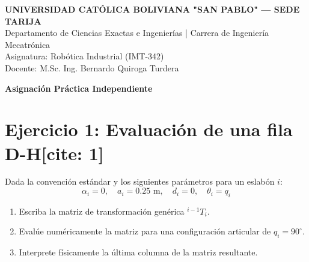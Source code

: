 \documentclass[11pt, a4paper]{article}
\begin{document}
\begin{center}
    \Large\textbf{\textcolor{ucbblue}{UNIVERSIDAD CATÓLICA BOLIVIANA "SAN PABLO" — SEDE TARIJA}}\\
    \vspace{0.2cm}
    \normalsize Departamento de Ciencias Exactas e Ingenierías | Carrera de Ingeniería Mecatrónica\\
    Asignatura: Robótica Industrial (IMT-342) \\
    Docente: M.Sc. Ing. Bernardo Quiroga Turdera
\end{center}

\vspace{0.4cm}
\begin{tcolorbox}[colback=ucbblue!5!white, colframe=ucbblue, title=\textbf{Hoja de Ejercicios: Cinemática Directa mediante D-H}]
    \centering \large \textbf{Asignación Práctica Independiente}
\end{tcolorbox}
\vspace{0.4cm}

\section*{Ejercicio 1: Evaluación de una fila D-H[cite: 1]}
Dada la convención estándar y los siguientes parámetros para un eslabón $i$:
\begin{equation*}
    \alpha_i = 0, \quad a_i = 0.25\text{ m}, \quad d_i = 0, \quad \theta_i = q_i
\end{equation*}
\begin{enumerate}
    \item Escriba la matriz de transformación genérica ${}^{i-1}T_i$.
    \item Evalúe numéricamente la matriz para una configuración articular de $q_i = 90^\circ$.
    \item Interprete físicamente la última columna de la matriz resultante.
\end{enumerate}
\end{document}
